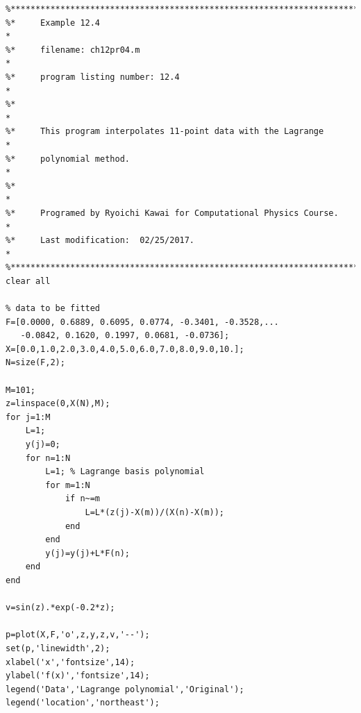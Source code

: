 \bigskip
\noindent
\program
\label{prog:lagrange_poly}
\footnotesize
\begin{verbatim}
%**************************************************************************
%*     Example 12.4                                                       *
%*     filename: ch12pr04.m                                               *
%*     program listing number: 12.4                                       *
%*                                                                        *
%*     This program interpolates 11-point data with the Lagrange          *
%*     polynomial method.                                                 *
%*                                                                        *
%*     Programed by Ryoichi Kawai for Computational Physics Course.       *
%*     Last modification:  02/25/2017.                                    *
%**************************************************************************
clear all

% data to be fitted
F=[0.0000, 0.6889, 0.6095, 0.0774, -0.3401, -0.3528,...
   -0.0842, 0.1620, 0.1997, 0.0681, -0.0736];
X=[0.0,1.0,2.0,3.0,4.0,5.0,6.0,7.0,8.0,9.0,10.];
N=size(F,2);

M=101;
z=linspace(0,X(N),M);
for j=1:M
    L=1;
    y(j)=0;
    for n=1:N
        L=1; % Lagrange basis polynomial
        for m=1:N
            if n~=m
                L=L*(z(j)-X(m))/(X(n)-X(m));
            end
        end
        y(j)=y(j)+L*F(n);
    end
end

v=sin(z).*exp(-0.2*z);

p=plot(X,F,'o',z,y,z,v,'--');
set(p,'linewidth',2);
xlabel('x','fontsize',14);
ylabel('f(x)','fontsize',14);
legend('Data','Lagrange polynomial','Original');
legend('location','northeast');
\end{verbatim}
\normalsize

